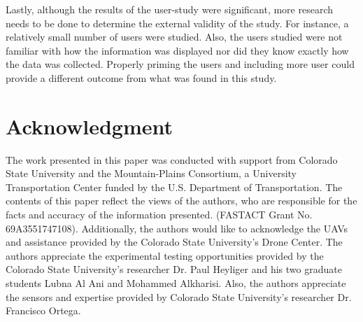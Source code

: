 \documentclass{sigchi}
\begin{document}
Lastly, although the results of the user-study were significant, more research needs to be done to determine the external validity of the study. For instance, a relatively small number of users were studied. Also, the users studied were not familiar with how the information was displayed nor did they know exactly how the data was collected. Properly priming the users and including more user could provide a different outcome from what was found in this study. 

\section{Acknowledgment}

The work presented in this paper was conducted with support from Colorado State University and the Mountain-Plains Consortium, a University Transportation Center funded by the U.S. Department of Transportation. The contents of this paper reflect the views of the authors, who are responsible for the facts and accuracy of the information presented. (FASTACT Grant No. 69A3551747108). Additionally, the authors would like to acknowledge the UAVs and assistance provided by the Colorado State University's Drone Center. The authors appreciate the experimental testing opportunities provided by the Colorado State University's researcher Dr. Paul Heyliger and his two graduate students Lubna Al Ani and Mohammed Alkharisi. Also, the authors appreciate the sensors and expertise provided by Colorado State  University's researcher Dr. Francisco Ortega.



\end{document}
